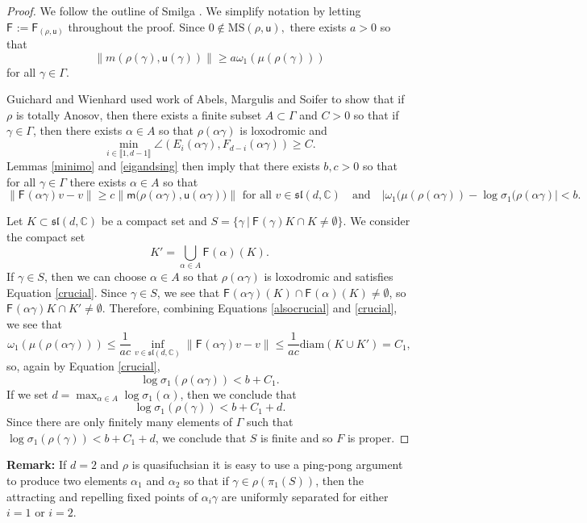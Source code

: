 \documentclass{amsart}
\theoremstyle{plain}
\theoremstyle{definition}
\theoremstyle{remark}
\newcommand{\aff}[1]{\sf{F}_{#1}}
\renewcommand{\sf}[1]{{\mathsf{#1}}}
\newcommand{\lb}{\llbracket}
\newcommand{\rb}{\rrbracket}
\newcommand{\C}{\mathbb C}
\renewcommand{\sl}{\mathfrak{sl}}
\newcommand{\<}{\left <}
\renewcommand{\>}{\right >}
\newcommand{\G}{\Gamma}
\newcommand{\g}{\gamma}
\newcommand{\M}{\mathrm{MS}}
\newcommand{\co}{\sf u}
\renewcommand{\C}{\mathbb C}
\begin{document}
\begin{proof} We follow the outline of Smilga \cite{Smig}. 
We simplify notation by letting $\aff{}:=\aff{(\rho,\co)}$ throughout the proof. 
Since $0\notin\M(\rho,\co),$ there exists $a>0$ so that
$$\|m(\rho(\g),\co(\g))\|\ge a\omega_1(\mu(\rho(\g)))$$
for all $\g\in\G$.

Guichard and Wienhard \cite[Thm. 5.10]{GW} used work of Abels, Margulis and Soifer \cite{AMS} to show that if $\rho$ is 
totally Anosov, then there exists a finite subset $A\subset\G$  and $C>0$ so that if $\gamma\in \G$, then there exists $\alpha\in A$ so that 
$\rho(\alpha\g)$ is loxodromic and
\begin{equation}
\label{alsocrucial}
\min_{i\in\lb1,d-1\rb}\angle(E_i(\alpha\g),F_{d-i}(\alpha\g))\ge C.
\end{equation}
Lemmas \ref{minimo} and \ref{eigandsing} then imply that there exists $b,c>0$ so that for all 
$\g\in\G$ there exists $\alpha\in A$ so that
\begin{equation}
\label{crucial}
\|\aff{}(\alpha\g)v-v\|\geq c\big\|\sf m\big(\rho(\alpha\g),\co(\alpha\g)\big)\big\| \text{ for all } v\in\sl(d,\C) \quad\text{and}\quad
|\omega_1(\mu(\rho(\alpha\g))-\log\sigma_1(\rho(\alpha\g)|<b.
\end{equation}


Let $K\subset \sl(d,\C)$ be a compact set and $S = \{\gamma\ | \ \aff{} (\g)K\cap K\neq\emptyset\}$. 
We consider the compact set 
$$K'=\bigcup_{\alpha\in A}\aff{}(\alpha)(K).$$ 
If $\gamma \in S$, then we can choose $\alpha\in A$ so that $\rho(\alpha\g)$ is loxodromic and satisfies Equation \eqref{crucial}.
Since $\gamma\in S$, we see that 
$\aff{} (\alpha\g)(K)\cap \aff{}(\alpha)(K)\neq\emptyset$, so $\aff{}(\alpha\g)K\cap K'\neq\emptyset.$ 
Therefore, combining Equations \eqref{alsocrucial} and \eqref{crucial}, we see that
$$\omega_1(\mu(\rho( \alpha\g))) \leq \frac{1}{ac}\inf_{v\in\sl(d,\C)} \|\aff{}(\alpha\g)v-v\| \leq \frac{1}{ac}\mbox{diam}(K\cup K') = C_1,$$ 
so, again by Equation \eqref{crucial},
$$\log\sigma_1(\rho(\alpha\g)) <b+C_1.$$
If we set $d=\max_{\alpha\in A}\log\sigma_1(\alpha)$, then we conclude that
$$\log\sigma_1(\rho(\g)) <b+C_1+d.$$
Since there are only finitely many elements of $\Gamma$ such that  $\log\sigma_1(\rho(\g)) <b+C_1+d$, we
conclude that  $S$ is finite and so $F$ is proper.

\end{proof}

\medskip\noindent
{\bf Remark:} If $d=2$ and $\rho$ is quasifuchsian  it is easy to use a ping-pong argument to produce two elements $\alpha_1$ and $\alpha_2$ 
so that if $\gamma\in \rho(\pi_1(S))$, then the attracting and repelling fixed points of $\alpha_i\gamma$ are uniformly separated for either $i=1$ or $i=2$.
\end{document}
